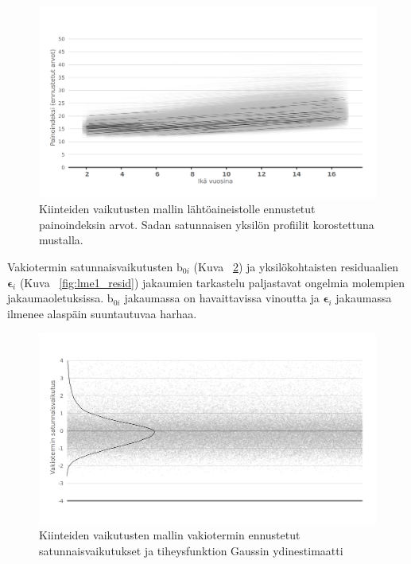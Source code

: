 \documentclass[finnish]{docopts}
\begin{document}
\begin{figure}[H]
\centering
  \includegraphics[scale=0.8]{kuvaajat/lme_bmi_ennuste.png}
  \caption{Kiinteiden vaikutusten mallin lähtöaineistolle ennustetut painoindeksin arvot. Sadan satunnaisen yksilön profiilit korostettuna mustalla.}
  \label{fig:lme1_bmi_pred}
\end{figure}

Vakiotermin satunnaisvaikutusten $\text{b}_{0i}$ (Kuva ~\ref{fig:lme1_ranef}) ja yksilökohtaisten residuaalien $\bm{\epsilon}_i$ (Kuva ~\ref{fig:lme1_resid}) jakaumien tarkastelu paljastavat ongelmia molempien jakaumaoletuksissa. $\text{b}_{0i}$ jakaumassa on havaittavissa vinoutta ja $\bm{\epsilon}_i$ jakaumassa ilmenee alaspäin suuntautuvaa harhaa.\\

\begin{figure}[H]
\centering
  \includegraphics[scale=0.8]{kuvaajat/lme_satunnaisvaikutukset.png}
  \caption{Kiinteiden vaikutusten mallin vakiotermin ennustetut satunnaisvaikutukset ja tiheysfunktion Gaussin ydinestimaatti}
  \label{fig:lme1_ranef}
\end{figure}
\end{document}
